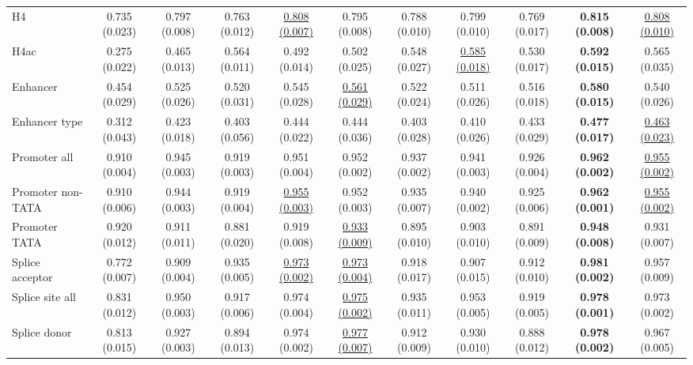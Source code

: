 \begin{table*}[!htb]
{\begin{tabular}{lcccccccccc}
H4 & 0.735 (0.023) & 0.797 (0.008) & 0.763 (0.012) & \underline{0.808 (0.007)} & 0.795 (0.008) & 0.788 (0.010) & 0.799 (0.010) & 0.769 (0.017) & \textbf{0.815 (0.008)} & \underline{0.808 (0.010)} \\
H4ac & 0.275 (0.022) & 0.465 (0.013) & 0.564 (0.011) & 0.492 (0.014) & 0.502 (0.025) & 0.548 (0.027) & \underline{0.585 (0.018)} & 0.530 (0.017) & \textbf{0.592 (0.015)} & 0.565 (0.035) \\
Enhancer & 0.454 (0.029) & 0.525 (0.026) & 0.520 (0.031) & 0.545 (0.028) & \underline{0.561 (0.029)} & 0.522 (0.024) & 0.511 (0.026) & 0.516 (0.018) & \textbf{0.580 (0.015)} & 0.540 (0.026) \\
Enhancer type & 0.312 (0.043) & 0.423 (0.018) & 0.403 (0.056) & 0.444 (0.022) & 0.444 (0.036) & 0.403 (0.028) & 0.410 (0.026) & 0.433 (0.029) & \textbf{0.477 (0.017)} & \underline{0.463 (0.023)} \\
Promoter all & 0.910 (0.004) & 0.945 (0.003) & 0.919 (0.003) & 0.951 (0.004) & 0.952 (0.002) & 0.937 (0.002) & 0.941 (0.003) & 0.926 (0.004) & \textbf{0.962 (0.002)} & \underline{0.955 (0.002)} \\
Promoter non-TATA & 0.910 (0.006) & 0.944 (0.003) & 0.919 (0.004) & \underline{0.955 (0.003)} & 0.952 (0.003) & 0.935 (0.007) & 0.940 (0.002) & 0.925 (0.006) & \textbf{0.962 (0.001)} & \underline{0.955 (0.002)} \\
Promoter TATA & 0.920 (0.012) & 0.911 (0.011) & 0.881 (0.020) & 0.919 (0.008) & \underline{0.933 (0.009)} & 0.895 (0.010) & 0.903 (0.010) & 0.891 (0.009) & \textbf{0.948 (0.008)} & 0.931 (0.007) \\
Splice acceptor & 0.772 (0.007) & 0.909 (0.004) & 0.935 (0.005) & \underline{0.973 (0.002)} & \underline{0.973 (0.004)} & 0.918 (0.017) & 0.907 (0.015) & 0.912 (0.010) & \textbf{0.981 (0.002)} & 0.957 (0.009) \\
Splice site all & 0.831 (0.012) & 0.950 (0.003) & 0.917 (0.006) & 0.974 (0.004) & \underline{0.975 (0.002)} & 0.935 (0.011) & 0.953 (0.005) & 0.919 (0.005) & \textbf{0.978 (0.001)} & 0.973 (0.002) \\
Splice donor & 0.813 (0.015) & 0.927 (0.003) & 0.894 (0.013) & 0.974 (0.002) & \underline{0.977 (0.007)} & 0.912 (0.009) & 0.930 (0.010) & 0.888 (0.012) & \textbf{0.978 (0.002)} & 0.967 (0.005) \\
\bottomrule
\end{tabular}
}
\label{tab:nucleotide_transformer_tasks}
\end{table*}